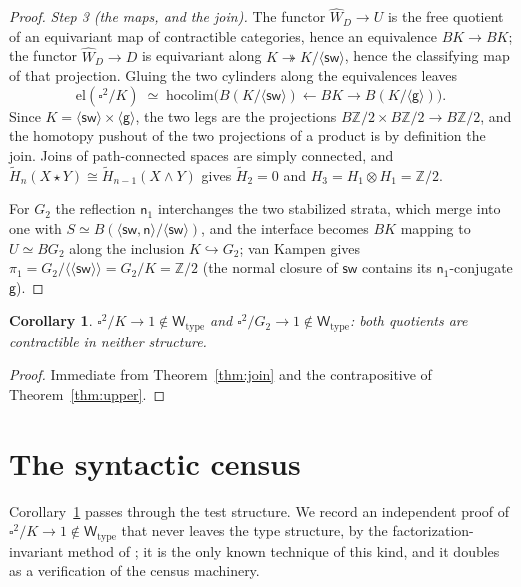 \documentclass[11pt]{amsart}
\newtheorem{cor}[thm]{Corollary}
\theoremstyle{definition}
\newcommand{\el}{\mathrm{el}}
\newcommand{\Wtype}{\mathsf{W}_{\mathrm{type}}}
\newcommand{\sw}{\mathsf{sw}}
\newcommand{\nb}{\mathsf{n}}
\newcommand{\gtw}{\mathsf{g}}
\newcommand{\Kl}{K}
\newcommand{\hopush}{\mathrm{hocolim}}
\begin{document}
\begin{proof}
  \emph{Step 3 (the maps, and the join).}  The functor
  $\widehat W_D \to U$ is the free quotient of an equivariant map
  of contractible categories, hence an equivalence $B\Kl \to
  B\Kl$; the functor $\widehat W_D \to D$ is equivariant along
  $\Kl \twoheadrightarrow \Kl/\langle\sw\rangle$, hence the
  classifying map of that projection.  Gluing the two cylinders
  along the equivalences leaves
  \[
    \el(\square^2/\Kl) \;\simeq\;
    \hopush\bigl( B(\Kl/\langle\sw\rangle) \longleftarrow B\Kl
    \longrightarrow B(\Kl/\langle\gtw\rangle) \bigr).
  \]
  Since $\Kl = \langle\sw\rangle \times \langle\gtw\rangle$, the
  two legs are the projections
  $B\mathbb{Z}/2 \times B\mathbb{Z}/2 \to B\mathbb{Z}/2$, and the
  homotopy pushout of the two projections of a product is by
  definition the join.  Joins of path-connected spaces are simply
  connected, and
  $\widetilde H_n(X \star Y) \cong \widetilde H_{n-1}(X \wedge
  Y)$ gives $\widetilde H_2 = 0$ and
  $H_3 = H_1 \otimes H_1 = \mathbb{Z}/2$.

  For $G_2$ the reflection $\nb_1$ interchanges the two stabilized
  strata, which merge into one with
  $S \simeq B(\langle \sw,\nb\rangle/\langle\sw\rangle)$, and the
  interface becomes $B\Kl$ mapping to $U \simeq BG_2$ along the
  inclusion $\Kl \hookrightarrow G_2$; van Kampen gives
  $\pi_1 = G_2/\langle\langle \sw \rangle\rangle =
  G_2/\Kl = \mathbb{Z}/2$ (the normal closure of $\sw$ contains
  its $\nb_1$-conjugate $\gtw$).
\end{proof}

\begin{cor}
  \label{cor:Wtype}
  $\square^2/\Kl \to 1 \notin \Wtype$ and
  $\square^2/G_2 \to 1 \notin \Wtype$: both quotients are
  contractible in \emph{neither} structure.
\end{cor}

\begin{proof}
  Immediate from Theorem~\ref{thm:join} and the contrapositive of
  Theorem~\ref{thm:upper}.
\end{proof}

\section{The syntactic census}
\label{sec:census}

Corollary~\ref{cor:Wtype} passes through the test structure.  We
record an independent proof of
$\square^2/\Kl \to 1 \notin \Wtype$ that never leaves the type
structure, by the factorization-invariant method of
\cite{CoqNote, PaperK}; it is the only known technique of this
kind, and it doubles as a verification of the census machinery.
\end{document}
